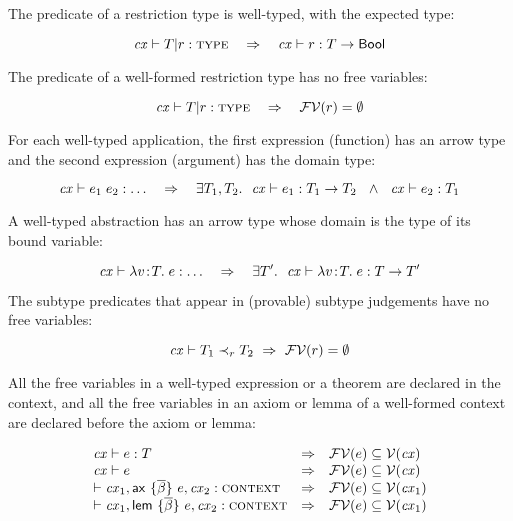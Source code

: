 
The predicate of a restriction type is well-typed, with the expected type:

\begin{theorem}\label{thm-tspred-wt}
\[
\istyO{\tsubO}\ \ \IMPLIES\ \ \hastyO{\tspred}{\tarr{\typ}{\bool}}
\]
\end{theorem}

The predicate of a well-formed restriction type has no free variables:

\begin{theorem}\label{thm-no-free-vars-in-types}
\[
\istyO{\tsubO}\ \ \IMPLIES\ \ \efvar{\tspred}=\emptyset
\]
\end{theorem}

For each well-typed application, the first expression (function) has an arrow
type and the second expression (argument) has the domain type:

\begin{theorem}\label{thm-eapp-inv}
\[
\hastyOany{\appO}
\ \ \IMPLIES\ \ 
\EXISTS{\typ_1,\typ_2}
       {\hastyO{\expr_1}{\tarrO}\ \AND\ \hastyO{\expr_2}{\typ_1}}
\]
\end{theorem}

A well-typed abstraction has an arrow type whose domain is the type of its
bound variable:

\begin{theorem}\label{thm-abs-arrty}
\[
\mathit{cx}\vdash\lambda v\!:\!T.\;e:\ldots
\ \ \ \Rightarrow\ \ \
\exists T'.\ \ \mathit{cx}\vdash\lambda v\!:\!T.\;e:T\to T'
\]
\end{theorem}

The subtype predicates that appear in (provable) subtype judgements have no
free variables:

\begin{theorem}\label{thm-subpred-no-free-vars}
\[
\mathit{cx}\vdash T_1\prec_{r}T_2\ \Rightarrow\ \mathcal{FV}(r)=\emptyset
\]
\end{theorem}

All the free variables in a well-typed expression or a theorem are declared in
the context, and all the free variables in an axiom or lemma of a well-formed
context are declared before the axiom or lemma:

\begin{theorem}\label{thm-free-var-in-cx}
\[
\begin{array}{l@{\ \ \IMPLIES\ \ }l}
\hastyO{\expr}{\typ}     & \efvar{\expr}\subseteq\cxvarO       \\
\theoO{\expr}            & \efvar{\expr}\subseteq\cxvarO       \\
\cxwf{\cx_1,\axO, \cx_2} & \efvar{\expr}\subseteq\cxvar{\cx_1} \\
\cxwf{\cx_1,\lemO,\cx_2} & \efvar{\expr}\subseteq\cxvar{\cx_1}
\end{array}
\]
\end{theorem}

